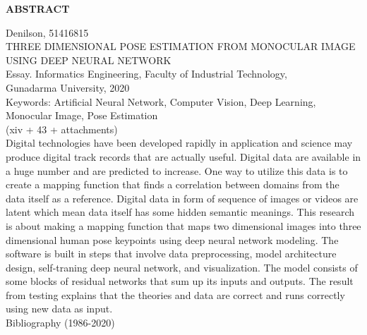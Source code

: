 \newpage %
\begin{center}
    \begin{large}\textbf{ABSTRACT}\end{large}
\end{center}

\vspace{5mm}

\noindent Denilson, 51416815 \\
THREE DIMENSIONAL POSE ESTIMATION FROM MONOCULAR IMAGE USING DEEP NEURAL NETWORK\\
Essay. Informatics Engineering, Faculty of Industrial Technology, \\
Gunadarma University, 2020\\
Keywords: Artificial Neural Network, Computer Vision, Deep Learning, Monocular Image, Pose Estimation\\
\noindent (xiv + 43 + attachments)\\

Digital technologies have been developed rapidly in application and science may produce digital track
records that are actually useful. Digital data are available in a huge number and are predicted to increase.
One way to utilize this data is to create a mapping function that finds a correlation between domains
from the data itself as a reference. Digital data in form of sequence of images or videos are latent
which mean data itself has some hidden semantic meanings. This research is about making a mapping
function that maps two dimensional images into three dimensional human pose keypoints using
deep neural network modeling. The software is built in steps that involve data preprocessing,
model architecture design, self-traning deep neural network, and visualization. The model consists of
some blocks of residual networks that sum up its inputs and outputs. The result from testing explains
that the theories and data are correct and runs correctly using new data as input.\\

\noindent Bibliography (1986-2020)